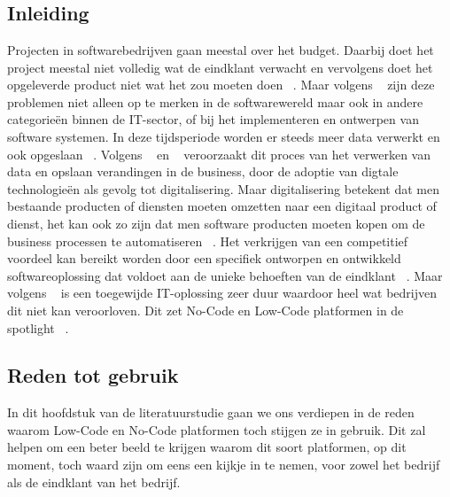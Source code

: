 \chapter{}%
\label{ch:stand-van-zaken}

\section{Inleiding}%
\label{sec:inleiding}
Projecten in softwarebedrijven gaan meestal over het budget. Daarbij doet het project meestal niet volledig wat de eindklant verwacht en vervolgens
doet het opgeleverde product niet wat het zou moeten doen ~\autocite{Moskal_2021}. Maar volgens ~\textcite{Moskal_2021} zijn deze problemen niet alleen op te merken 
in de softwarewereld maar ook in andere categorieën binnen de IT-sector, of bij het implementeren en ontwerpen van software systemen. In deze tijdsperiode worden er steeds meer
data verwerkt en ook opgeslaan ~\autocite{Moskal_2021}. Volgens ~\textcite{Moskal_2021} en ~\textcite{Parviainen_2022} veroorzaakt dit proces van het verwerken van data en opslaan
verandingen in de business, door de adoptie van digtale technologieën als gevolg tot digitalisering. Maar digitalisering betekent dat men bestaande producten of diensten moeten omzetten
naar een digitaal product of dienst, het kan ook zo zijn dat men software producten moeten kopen om de business processen te automatiseren ~\autocite{Moskal_2021}. Het verkrijgen van een competitief voordeel
kan bereikt worden door een specifiek ontworpen en ontwikkeld softwareoplossing dat voldoet aan de unieke behoeften van de eindklant ~\autocite{Moskal_2021}. Maar volgens ~\textcite{Moskal_2021} is een toegewijde IT-oplossing
zeer duur waardoor heel wat bedrijven dit niet kan veroorloven. Dit zet No-Code en Low-Code platformen in de spotlight  ~\autocite{Moskal_2021}.

\section{Reden tot gebruik}%
\label{sec:reden-tot-gebruik}
In dit hoofdstuk van de literatuurstudie gaan we ons verdiepen in de reden waarom Low-Code en No-Code platformen toch stijgen ze in gebruik. Dit zal helpen
om een beter beeld te krijgen waarom dit soort platformen, op dit moment, toch waard zijn om eens een kijkje in te nemen, voor zowel het bedrijf als de eindklant van het bedrijf.

